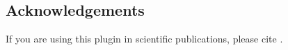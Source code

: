 \subsection{Acknowledgements}

If you are using this plugin in scientific publications, please cite \citet{Zotti:SEAC2015}.



